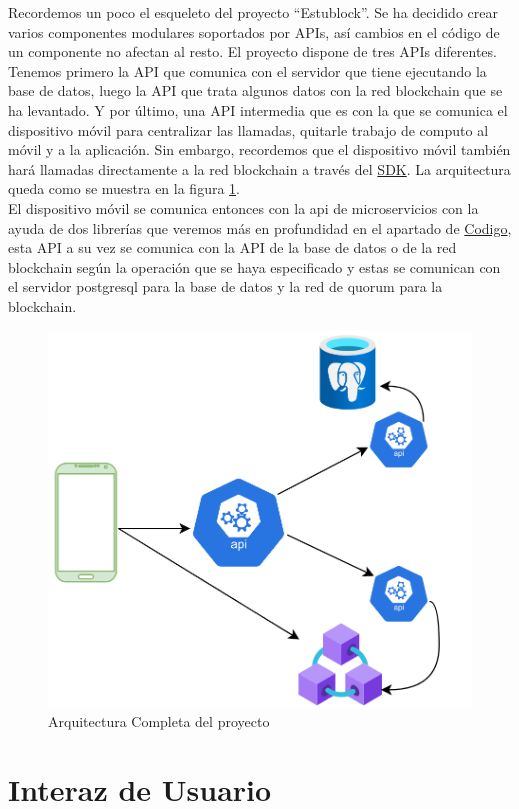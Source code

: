 Recordemos un poco el esqueleto del proyecto ``Estublock''. Se ha decidido crear varios componentes modulares soportados por APIs, así cambios en el código de un componente no afectan al resto. El proyecto dispone de tres APIs diferentes. Tenemos primero la API que comunica con el servidor que tiene ejecutando la base de datos, luego la API que trata algunos datos con la red blockchain que se ha levantado. Y por último, una API intermedia que es con la que se comunica el dispositivo móvil para centralizar las llamadas, quitarle trabajo de computo al móvil y a la aplicación. Sin embargo, recordemos que el dispositivo móvil también hará llamadas directamente a la red blockchain a través del \hyperref[sec:SDK]{SDK}. La arquitectura queda como se muestra en la figura \ref{fig:estublockArch}. \\

El dispositivo móvil se comunica entonces con la api de microservicios con la ayuda de dos librerías que veremos más en profundidad en el apartado de \hyperref[sec:Codigo]{Codigo}, esta API a su vez se comunica con la API de la base de datos o de la red blockchain según la operación que se haya especificado y estas se comunican con el servidor postgresql para la base de datos y la red de quorum para la blockchain. \\

\begin{figure}[h!]
  \centering
  \includegraphics[width=0.4\linewidth]{figs/Desarrollo/Arquitectura}
  \caption[Arquitectura]{Arquitectura Completa del proyecto}
  \label{fig:estublockArch}
\end{figure}

\section{Interaz de Usuario}

